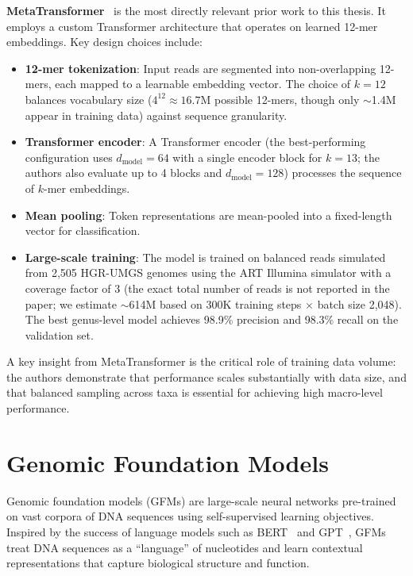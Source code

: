 \textbf{MetaTransformer}~\cite{Wichmann2023} is the most directly relevant prior work to this thesis. It employs a custom Transformer architecture that operates on learned 12-mer embeddings. Key design choices include:
\begin{itemize}
    \item \textbf{12-mer tokenization}: Input reads are segmented into non-overlapping 12-mers, each mapped to a learnable embedding vector. The choice of $k=12$ balances vocabulary size ($4^{12} \approx 16.7$M possible 12-mers, though only $\sim$1.4M appear in training data) against sequence granularity.
    \item \textbf{Transformer encoder}: A Transformer encoder (the best-performing configuration uses $d_{\text{model}}=64$ with a single encoder block for $k=13$; the authors also evaluate up to 4 blocks and $d_{\text{model}}=128$) processes the sequence of $k$-mer embeddings.
    \item \textbf{Mean pooling}: Token representations are mean-pooled into a fixed-length vector for classification.
    \item \textbf{Large-scale training}: The model is trained on balanced reads simulated from 2,505 HGR-UMGS genomes using the ART Illumina simulator with a coverage factor of 3 (the exact total number of reads is not reported in the paper; we estimate $\sim$614M based on 300K training steps $\times$ batch size 2,048). The best genus-level model achieves 98.9\% precision and 98.3\% recall on the validation set.
\end{itemize}

A key insight from MetaTransformer is the critical role of training data volume: the authors demonstrate that performance scales substantially with data size, and that balanced sampling across taxa is essential for achieving high macro-level performance.

\section{Genomic Foundation Models}
\label{sec:bg-gfm}

Genomic foundation models (GFMs) are large-scale neural networks pre-trained on vast corpora of DNA sequences using self-supervised learning objectives. Inspired by the success of language models such as BERT~\cite{Devlin2019} and GPT~\cite{Brown2020}, GFMs treat DNA sequences as a ``language'' of nucleotides and learn contextual representations that capture biological structure and function.

